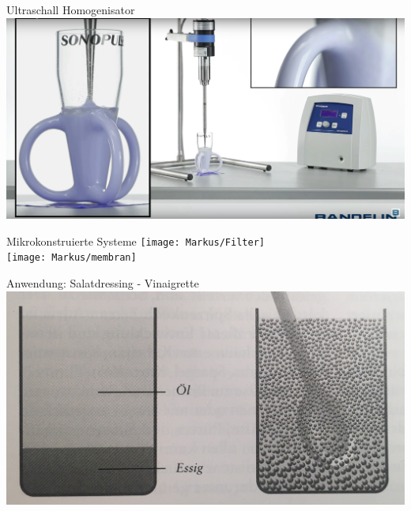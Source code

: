 \documentclass{beamer} %
\begin{document}
\begin{frame}{Ultraschall Homogenisator}
	\centering
	\includegraphics[width=\linewidth]{Markus/uh6}
\end{frame}

\begin{frame}{Mikrokonstruierte Systeme}
	\centering
	\texttt{[image: Markus/Filter]}\\
	\texttt{[image: Markus/membran]}
\end{frame}

\begin{frame}{Anwendung: Salatdressing - Vinaigrette}
	\centering
	\includegraphics[width=0.7\linewidth]{Markus/Vinaigrette}
\end{frame}


\end{document}
